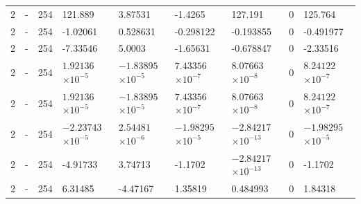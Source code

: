 \begin{longtable}
{}2 & \allowbreak{}-\allowbreak{} & 254 & 121.889 & 3.87531 & -1.4265 & 127.191 & 0 & 125.764 \\
{}2 & \allowbreak{}-\allowbreak{} & 254 & -1.02061 & 0.528631 & -0.298122 & -0.193855 & 0 & -0.491977 \\
{}2 & \allowbreak{}-\allowbreak{} & 254 & -7.33546 & 5.0003 & -1.65631 & -0.678847 & 0 & -2.33516 \\
{}2 & \allowbreak{}-\allowbreak{} & 254 &  &  &  &  & 0 &  \\
{}2 & \allowbreak{}-\allowbreak{} & 254 &  &  &  &  & 0 &  \\
{}2 & \allowbreak{}-\allowbreak{} & 254 &  &  &  &  & 0 &  \\
{}2 & \allowbreak{}-\allowbreak{} & 254 & -4.91733 & 3.74713 & -1.1702 &  & 0 & -1.1702 \\
{}2 & \allowbreak{}-\allowbreak{} & 254 & 6.31485 & -4.47167 & 1.35819 & 0.484993 & 0 & 1.84318 \\
\end{longtable}\endgroup

